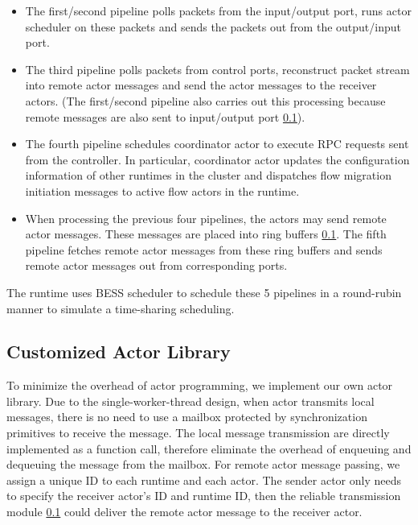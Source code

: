 \begin{itemize}

\item The first/second pipeline polls packets from the input/output port, runs actor scheduler on these packets and sends the packets out from the output/input port.

\item The third pipeline polls packets from control ports, reconstruct packet stream into remote actor messages and send the actor messages to the receiver actors. (The first/second pipeline also carries out this processing because remote messages are also sent to input/output port \ref{}).

\item The fourth pipeline schedules coordinator actor to execute RPC requests sent from the controller. In particular, coordinator actor updates the configuration information of other runtimes in the cluster and dispatches flow migration initiation messages to active flow actors in the runtime.

\item When processing the previous four pipelines, the actors may send remote actor messages. These messages are placed into ring buffers \ref{}. The fifth pipeline fetches remote actor messages from these ring buffers and sends remote actor messages out from corresponding ports.

\end{itemize}

The runtime uses BESS scheduler to schedule these 5 pipelines in a round-rubin manner to simulate a time-sharing scheduling.

\subsection{Customized Actor Library}

To minimize the overhead of actor programming, we implement our own actor library. Due to the single-worker-thread design, when actor transmits local messages, there is no need to use a mailbox \cite{caf} \cite{akka} protected by synchronization primitives to receive the message. The local message transmission are directly implemented as a function call, therefore eliminate the overhead of enqueuing and dequeuing the message from the mailbox. For remote actor message passing, we assign a unique ID to each runtime and each actor. The sender actor only needs to specify the receiver actor's ID and runtime ID, then the reliable transmission module \ref{} could deliver the remote actor message to the receiver actor.

